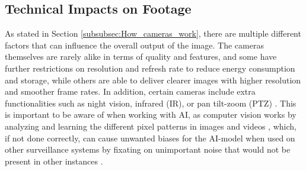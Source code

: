 \subsection{Technical Impacts on Footage}
As stated in Section \ref{subsubsec:How_cameras_work}, there are multiple different factors that can influence the overall output of the image. The cameras themselves are rarely alike in terms of quality and features, and some have further restrictions on resolution and refresh rate to reduce energy consumption and storage, while others are able to deliver clearer images with higher resolution and smoother frame rates. In addition, certain cameras include extra functionalities such as night vision, infrared (\acs{IR}), or pan tilt-zoom (\acs{PTZ}) \cite{nightvision_enhancement2018}. This is important to be aware of when working with \ac{AI}, as computer vision works by analyzing and learning the different pixel patterns in images and videos \cite{common_challenges_image_class2024}, which, if not done correctly, can cause unwanted biases for the \acs{AI}-model when used on other surveillance systems by fixating on unimportant noise that would not be present in other instances \cite{opencv2025visionproblems}.

